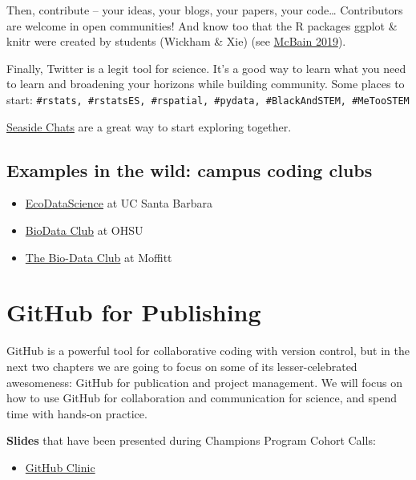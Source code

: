\documentclass[
  letterpaper,
  DIV=11,
  numbers=noendperiod]{scrreprt}
\providecommand{\tightlist}{%
  \setlength{\itemsep}{0pt}\setlength{\parskip}{0pt}}
\begin{document}
Then, contribute -- your ideas, your blogs, your papers, your
code\ldots{} Contributors are welcome in open communities! And know too
that the R packages ggplot \& knitr were created by students (Wickham \&
Xie) (see
\href{https://resources.rstudio.com/rstudio-conf-2019/our-colour-of-magic-the-open-sourcery-of-fantastic-r-packages}{McBain
2019}).

Finally, Twitter is a legit tool for science. It's a good way to learn
what you need to learn and broadening your horizons while building
community. Some places to start:
\texttt{\#rstats,\ \#rstatsES,\ \#rspatial,\ \#pydata,\ \#BlackAndSTEM,\ \#MeTooSTEM}

\href{https://github.com/Openscapes/seaside-chats\#seaside-chats}{Seaside
Chats} are a great way to start exploring together.

\hypertarget{examples-in-the-wild-campus-coding-clubs}{%
\section{Examples in the wild: campus coding
clubs}\label{examples-in-the-wild-campus-coding-clubs}}

\begin{itemize}
\tightlist
\item
  \href{http://eco-data-science.github.io/}{EcoDataScience} at UC Santa
  Barbara
\item
  \href{https://biodata-club.github.io}{BioData Club} at OHSU
\item
  \href{https://www.biodataclub.org/}{The Bio-Data Club} at Moffitt
\end{itemize}

\hypertarget{github-pub}{%
\chapter{GitHub for Publishing}\label{github-pub}}

GitHub is a powerful tool for collaborative coding with version control,
but in the next two chapters we are going to focus on some of its
lesser-celebrated awesomeness: GitHub for publication and project
management. We will focus on how to use GitHub for collaboration and
communication for science, and spend time with hands-on practice.

\textbf{Slides} that have been presented during Champions Program Cohort
Calls:

\begin{itemize}
\tightlist
\item
  \href{https://docs.google.com/presentation/d/1PzGAbEpNhT6CDPe1DCHf5-eVAjy-2R2D3VMHz7dY774/edit?usp=sharing}{GitHub
  Clinic}
\end{itemize}
\end{document}
